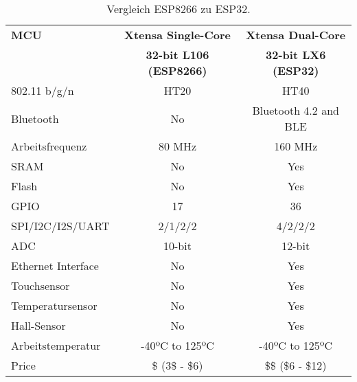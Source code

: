 \begin{table}[!h]
\center
\begin{tabular}{|l|c|c|}
\hline
\textbf{MCU}                    & \textbf{Xtensa Single-Core} & \textbf{Xtensa Dual-Core} \\

			                   & \textbf{32-bit L106 (ESP8266)} & \textbf{32-bit LX6 (ESP32)} \\ \hline

802.11 b/g/n     		& HT20                           & HT40                                       \\
Bluetooth              	& No                             & Bluetooth 4.2 and BLE                      \\
Arbeitsfrequenz			& 80 MHz                         & 160 MHz                                    \\
SRAM                   	& No                             & Yes                                         \\
Flash                  	& No                             & Yes                                          \\
GPIO                   	& 17                             & 36                                         \\
SPI/I2C/I2S/UART       	& 2/1/2/2                        & 4/2/2/2                                    \\
ADC                    	& 10-bit                         & 12-bit                                     \\
Ethernet Interface 		& No                             & Yes                                          \\
Touchsensor           	& No                             & Yes                                          \\
Temperatursensor     	& No                             & Yes                                          \\
Hall-Sensor     			& No                             & Yes \\
Arbeitstemperatur    	& -40ºC to 125ºC                 & -40ºC to 125ºC                             \\
Price                  	& \$ (3\$ - \$6)                 & \$\$ (\$6 - \$12)    \\                         
\hline
\end{tabular}
\caption{Vergleich ESP8266 zu ESP32.}
\label{tab:ESP}
\end{table}

